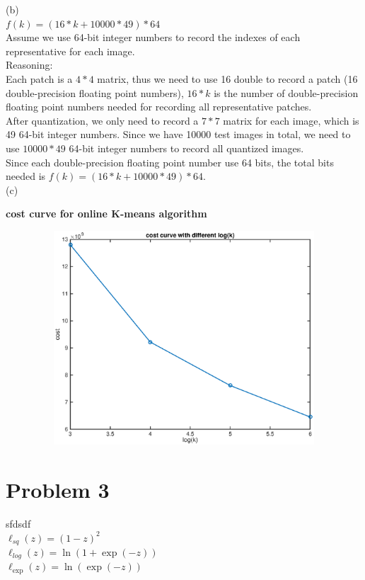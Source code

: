 \documentclass[twoside,11pt]{homework}
\begin{document}
\newpage

(b) \\ \indent
$f(k) = (16 * k + 10000 * 49) * 64$ \\ \indent
Assume we use 64-bit integer numbers to record the indexes of each representative for each image. \\
Reasoning: \\ \indent
Each patch is a $4 * 4$ matrix, thus we need to use 16 double to record a patch (16 double-precision floating point numbers), $16 * k$ is the number of double-precision floating point numbers needed for recording all representative patches. \\ \indent
After quantization, we only need to record a $7 * 7$ matrix for each image,  which is 49 64-bit integer numbers. Since we have 10000 test images in total,  we need to use $10000 * 49$ 64-bit integer numbers to record all quantized images. \\ \indent
Since each double-precision floating point number use 64 bits, the total bits needed is $f(k) = (16 * k + 10000 * 49) * 64$.\\


(c) \\ \indent
\begin{center}
\textbf{cost curve for online K-means algorithm}\par\medskip
\includegraphics[width=150mm, height = 80mm]{cost_curve.eps}
\end{center}












\section*{Problem 3}
sfdsdf\\
$\ell_{sq} (z) = (1 - z) ^ 2$ \\
$\ell_{log}(z) = \ln (1 + \exp (-z))$\\
$\ell_{\exp}(z) = \ln (\exp (-z))$ \\
\end{document}
